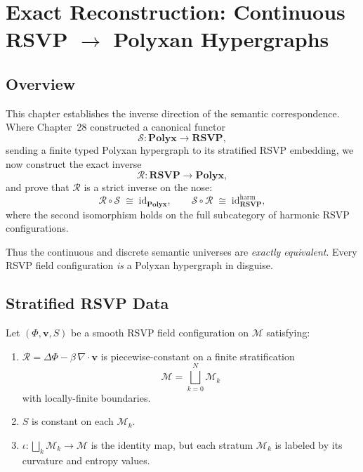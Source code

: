 \chapter{Exact Reconstruction: Continuous RSVP $\to$ Polyxan Hypergraphs}
\label{ch:reconstruction}

\section*{Overview}

This chapter establishes the inverse direction of the semantic correspondence.
Where Chapter~28 constructed a canonical functor
\[
\mathcal{S} : \mathbf{Polyx} \longrightarrow \mathbf{RSVP},
\]
sending a finite typed Polyxan hypergraph to its stratified RSVP embedding,
we now construct the exact inverse
\[
\mathcal{R} : \mathbf{RSVP} \longrightarrow \mathbf{Polyx},
\]
and prove that $\mathcal{R}$ is a strict inverse on the nose:
\[
\mathcal{R}\circ\mathcal{S} \;\cong\; \mathrm{id}_{\mathbf{Polyx}},
\qquad
\mathcal{S}\circ\mathcal{R} \;\cong\; \mathrm{id}_{\mathbf{RSVP}}^{\mathrm{harm}},
\]
where the second isomorphism holds on the full subcategory of
harmonic RSVP configurations.

Thus the continuous and discrete semantic universes are
\emph{exactly equivalent}.  
Every RSVP field configuration \emph{is} a Polyxan hypergraph in disguise.

\section{Stratified RSVP Data}

Let $(\Phi,\mathbf{v},S)$ be a smooth RSVP field configuration on $\mathcal{M}$
satisfying:

\begin{enumerate}
\item $\mathcal{R} = \Delta\Phi - \beta\,\nabla\cdot\mathbf{v}$  
      is piecewise-constant on a finite stratification
      \[
      \mathcal{M} = \bigsqcup_{k=0}^N \mathcal{M}_k
      \]
      with locally-finite boundaries.

\item $S$ is constant on each $\mathcal{M}_k$.

\item $\iota : \bigsqcup_k \mathcal{M}_k \to \mathcal{M}$ is the identity map,
      but each stratum $\mathcal{M}_k$ is labeled by its curvature and entropy
      values.
\end{enumerate}

